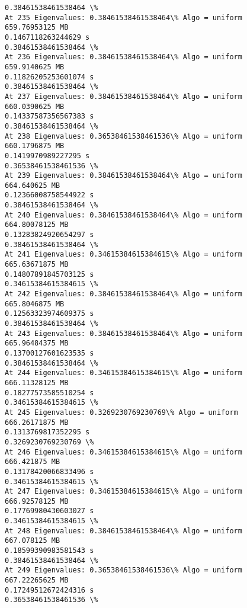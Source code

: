 \documentclass[11pt]{article}
\begin{document}
\begin{Verbatim}[commandchars=\\\{\}]
0.38461538461538464 \%
At 235 Eigenvalues: 0.38461538461538464\% Algo = uniform
659.76953125 MB
0.1467118263244629 s
0.38461538461538464 \%
At 236 Eigenvalues: 0.38461538461538464\% Algo = uniform
659.9140625 MB
0.11826205253601074 s
0.38461538461538464 \%
At 237 Eigenvalues: 0.38461538461538464\% Algo = uniform
660.0390625 MB
0.14337587356567383 s
0.38461538461538464 \%
At 238 Eigenvalues: 0.36538461538461536\% Algo = uniform
660.1796875 MB
0.1419970989227295 s
0.36538461538461536 \%
At 239 Eigenvalues: 0.38461538461538464\% Algo = uniform
664.640625 MB
0.12366008758544922 s
0.38461538461538464 \%
At 240 Eigenvalues: 0.38461538461538464\% Algo = uniform
664.80078125 MB
0.13283824920654297 s
0.38461538461538464 \%
At 241 Eigenvalues: 0.34615384615384615\% Algo = uniform
665.63671875 MB
0.14807891845703125 s
0.34615384615384615 \%
At 242 Eigenvalues: 0.38461538461538464\% Algo = uniform
665.8046875 MB
0.12563323974609375 s
0.38461538461538464 \%
At 243 Eigenvalues: 0.38461538461538464\% Algo = uniform
665.96484375 MB
0.13700127601623535 s
0.38461538461538464 \%
At 244 Eigenvalues: 0.34615384615384615\% Algo = uniform
666.11328125 MB
0.18277573585510254 s
0.34615384615384615 \%
At 245 Eigenvalues: 0.3269230769230769\% Algo = uniform
666.26171875 MB
0.1313769817352295 s
0.3269230769230769 \%
At 246 Eigenvalues: 0.34615384615384615\% Algo = uniform
666.421875 MB
0.13178420066833496 s
0.34615384615384615 \%
At 247 Eigenvalues: 0.34615384615384615\% Algo = uniform
666.92578125 MB
0.17769980430603027 s
0.34615384615384615 \%
At 248 Eigenvalues: 0.38461538461538464\% Algo = uniform
667.078125 MB
0.18599390983581543 s
0.38461538461538464 \%
At 249 Eigenvalues: 0.36538461538461536\% Algo = uniform
667.22265625 MB
0.17249512672424316 s
0.36538461538461536 \%

    \end{Verbatim}

    \begin{center}
    \end{center}
    { \hspace*{\fill} \\}
    
\end{document}
